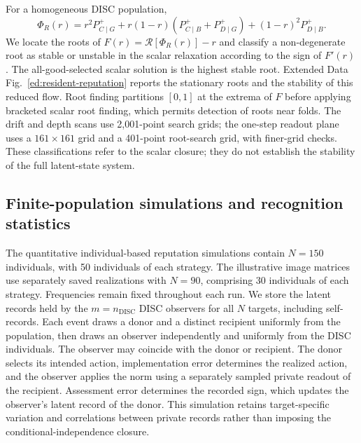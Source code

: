 \documentclass[fleqn,10pt]{article}
\begin{document}
For a homogeneous DISC population,
\begin{equation}
\Phi_R(r)=r^2P^+_{C\mid G}+r(1-r)(P^+_{C\mid B}+P^+_{D\mid G})
+(1-r)^2P^+_{D\mid B}.
\label{eq:methods-resident-assessment}
\end{equation}
We locate the roots of $F(r)=\mathcal R[\Phi_R(r)]-r$ and classify a non-degenerate root as stable or unstable in the scalar relaxation according to the sign of $F'(r)$. The all-good-selected scalar solution is the highest stable root. Extended Data Fig.~\ref{ed:resident-reputation} reports the stationary roots and the stability of this reduced flow. Root finding partitions $[0,1]$ at the extrema of $F$ before applying bracketed scalar root finding, which permits detection of roots near folds. The drift and depth scans use 2,001-point search grids; the one-step readout plane uses a $161\times161$ grid and a 401-point root-search grid, with finer-grid checks. These classifications refer to the scalar closure; they do not establish the stability of the full latent-state system.

\subsection*{Finite-population simulations and recognition statistics}

The quantitative individual-based reputation simulations contain $N=150$ individuals, with 50 individuals of each strategy. The illustrative image matrices use separately saved realizations with $N=90$, comprising 30 individuals of each strategy. Frequencies remain fixed throughout each run. We store the latent records held by the $m=n_{\mathrm{DISC}}$ DISC observers for all $N$ targets, including self-records. Each event draws a donor and a distinct recipient uniformly from the population, then draws an observer independently and uniformly from the DISC individuals. The observer may coincide with the donor or recipient. The donor selects its intended action, implementation error determines the realized action, and the observer applies the norm using a separately sampled private readout of the recipient. Assessment error determines the recorded sign, which updates the observer's latent record of the donor. This simulation retains target-specific variation and correlations between private records rather than imposing the conditional-independence closure.
\end{document}
